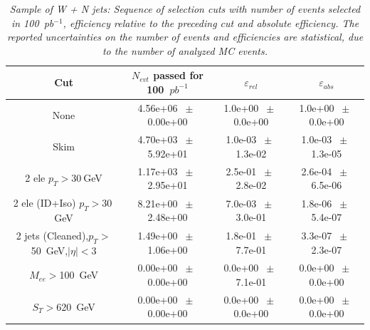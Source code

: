 \begin{table}[htbp]
\begin{center}
\begin{tabular}{|c|c|c|c|}
\hline\hline
 Cut & $N_{evt}$ passed for 100~$pb^{-1}$ & $\varepsilon_{rel}$ & $\varepsilon_{abs}$ \\
\hline\hline
None       &        4.56e+06       $~\pm~$       0.00e+00        &        1.0e+00       $~\pm~$       0.0e+00        &        1.0e+00       $~\pm~$       0.0e+00       \\       
       Skim       &        4.70e+03       $~\pm~$       5.92e+01        &        1.0e-03       $~\pm~$       1.3e-02        &        1.0e-03       $~\pm~$       1.3e-05       \\       
       2 ele $p_T>30~$GeV       &        1.17e+03       $~\pm~$       2.95e+01        &        2.5e-01       $~\pm~$       2.8e-02        &        2.6e-04       $~\pm~$       6.5e-06       \\       
       2 ele (ID+Iso) $p_T>30~$GeV       &        8.21e+00       $~\pm~$       2.48e+00        &        7.0e-03       $~\pm~$       3.0e-01        &        1.8e-06       $~\pm~$       5.4e-07       \\       
       2 jets (Cleaned),$p_T>$50~GeV,$|\eta|<$3       &        1.49e+00       $~\pm~$       1.06e+00        &        1.8e-01       $~\pm~$       7.7e-01        &        3.3e-07       $~\pm~$       2.3e-07       \\       
       $M_{ee}>$100~GeV       &        0.00e+00       $~\pm~$       0.00e+00        &        0.0e+00       $~\pm~$       7.1e-01        &        0.0e+00       $~\pm~$       0.0e+00       \\       
       $S_T>$620~GeV       &        0.00e+00       $~\pm~$       0.00e+00        &        0.0e+00       $~\pm~$       0.0e+00        &        0.0e+00       $~\pm~$       0.0e+00       \\       
          \hline\hline
\end{tabular}
\end{center}
\caption{\small \sl Sample of W + N jets: Sequence of selection cuts with number of events selected in 100~pb$^{-1}$, efficiency relative to the preceding cut and absolute efficiency.  The reported uncertainties on the number of events and efficiencies are statistical, due to the number of analyzed MC events.}
\label{tab:effic-W}
\end{table}

